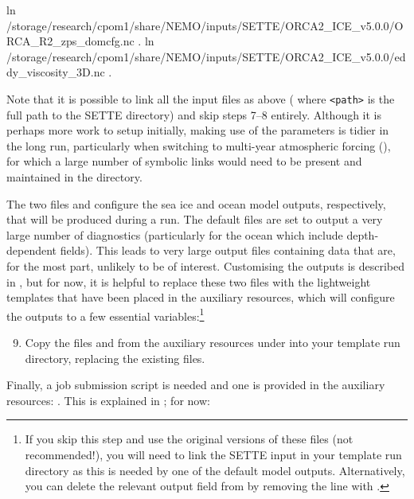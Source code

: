 \begingroup\scriptsize
\begin{VerbatimCMD}
ln  /storage/research/cpom1/share/NEMO/inputs/SETTE/ORCA2_ICE_v5.0.0/ORCA_R2_zps_domcfg.nc .
ln  /storage/research/cpom1/share/NEMO/inputs/SETTE/ORCA2_ICE_v5.0.0/eddy_viscosity_3D.nc .
\end{VerbatimCMD}
\endgroup

Note that it is possible to link all the input files as above ( where \texttt{<path>} is the full path to the SETTE directory) and skip steps \mbox{7--8} entirely.
Although it is perhaps more work to setup initially, making use of the  parameters is tidier in the long run, particularly when switching to multi-year atmospheric forcing (), for which a large number of symbolic links would need to be present and maintained in the  directory.

The two files  and  configure the sea ice and ocean model outputs, respectively, that will be produced during a run.
The default files are set to output a very large number of diagnostics (particularly for the ocean which include depth-dependent fields).
This leads to very large output files containing data that are, for the most part, unlikely to be of interest.
Customising the outputs is described in , but for now, it is helpful to replace these two files with the lightweight templates that have been placed in the auxiliary resources, which will configure the outputs to a few essential variables:\footnote{
    If you skip this step and use the original versions of these files (not recommended!), you will need to link the SETTE input  in your template run directory as this is needed by one of the default model outputs.
    Alternatively, you can delete the relevant output field from  by removing the line with .
}

\begin{enumerate}\setcounter{enumi}{8}
    \item Copy the files  and  from the auxiliary resources under  into your template run directory, replacing the existing files.
\end{enumerate}

Finally, a job submission script is needed and one is provided in the auxiliary resources:  .
This is explained in ; for now:

